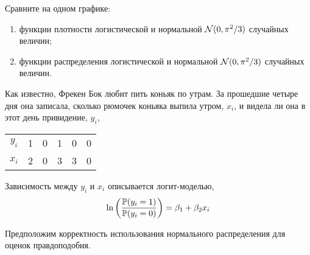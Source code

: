\begin{problem}
\useR Сравните на одном графике:
\begin{enumerate}
\item функции плотности логистической и нормальной $\cN(0,\pi^2/3)$ случайных величин;
\item функции распределения логистической и нормальной $\cN(0,\pi^2/3)$ случайных величин.
\end{enumerate}

\begin{sol}
\end{sol}
\end{problem}



\begin{problem}
Как известно, Фрекен Бок любит пить коньяк по утрам. За прошедшие четыре дня она записала, сколько рюмочек коньяка выпила утром, $x_i$, и видела ли она в этот день привидение, $y_i$,

\begin{tabular}{c|ccccc}
\toprule
$y_i$ & 1 & 0 & 1 & 0 & 0 \\
$x_i$ & 2 & 0 & 3 & 3 & 0 \\
\bottomrule
\end{tabular}

Зависимость между $y_i$ и $x_i$ описывается логит-моделью,
\[
\ln
\left(
  \frac{\P(y_i=1)}{\P(y_i=0)}
\right)
=\beta_1+\beta_2 x_i
\]

Предположим корректность использования нормального распределения для оценок правдоподобия.


\end{problem}
